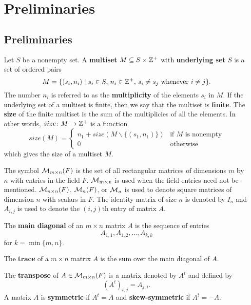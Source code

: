\chapter{Preliminaries}
\section{Preliminaries}

\begin{definition}
Let $S$ be a nonempty set. A \textbf{multiset} $M\subseteq S\times{\mathbb{Z}}^+$ with \textbf{underlying set} $S$ is a set of ordered pairs
\[M=\{(s_i,n_i)\mid s_i\in S,\, n_i\in{\mathbb{Z}}^+,\,s_i\neq s_j\text{ whenever } i\neq j\}.\]
The number $n_i$ is referred to as the \textbf{multiplicity} of the elements $s_i$ in $M$. If the underlying set of a multiset is finite, then we say that the multiset is \textbf{finite}. The \textbf{size} of the finite multiset is the sum of the multiplicies of all the elements. In other words, $size\colon M\rightarrow{\mathbb{Z}}^+$ is a function
\[size(M)=\begin{cases}n_1+size(M\backslash\{(s_1,n_1)\}) & \text{if $M$ is nonempty}\\
0 & \text{otherwise}
\end{cases}\]
which gives the size of a multiset $M$.
\end{definition}

The symbol ${\mathcal{M}}_{m\times n}(F)$ is the set of all rectangular matrices of dimensions $m$ by $n$ with entries in the field $F$. ${\mathcal{M}}_{m\times n}$ is used when the field entries need not be mentioned. ${\mathcal{M}}_{n\times n}(F)$, ${\mathcal{M}}_n(F)$, or ${\mathcal{M}}_n$ is used to denote square matrices of dimension $n$ with scalars in $F$. The identity matrix of size $n$ is denoted by $I_n$ and $A_{i,j}$ is used to denote the $(i,j)$th entry of matrix $A$. 

\begin{definition}
The \textbf{main diagonal} of an $m\times n$ matrix $A$ is the sequence of entries
\[A_{1,1},A_{1,2},\ldots,A_{k,k}\]
for $k=\min\{m,n\}$.
\end{definition}

\begin{definition}
The \textbf{trace} of a $m\times n$ matrix $A$ is the sum over the main diagonal of $A$.
\end{definition}

\begin{definition}
The \textbf{transpose} of $A\in {\mathcal{M}}_{m\times n}(F)$ is a matrix denoted by $A^t$ and defined by
\[(A^t)_{i,j}=A_{j,i}.\]
A matrix $A$ is \textbf{symmetric} if $A^t=A$ and \textbf{skew-symmetric} if $A^t=-A$.
\end{definition}

